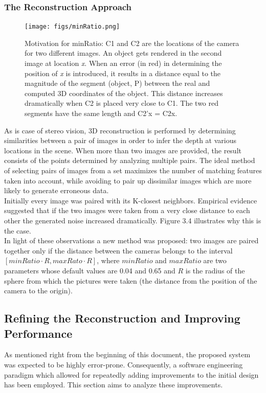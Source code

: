 \documentclass[12pt,a4paper,twoside,openright]{report}
\begin{document}
\subsubsection{The Reconstruction Approach}
\begin{figure}
\begin{center}
\texttt{[image: figs/minRatio.png]} 
\caption{Motivation for minRatio: C1 and C2 are the locations of the camera for two different images. An object gets rendered in the second image at location \emph{x}. When an error (in red) in determining the position of \emph{x} is introduced, it results in a distance equal to the magnitude of the segment (object, P) between the real and computed 3D coordinates of the object. This distance increases dramatically when C2 is placed very close to C1. The two red segments have the same length and C2'x = C2x.}
\end{center}
\end{figure}
As is case of stereo vision, 3D reconstruction is performed by determining similarities between a pair of images in order to infer the depth at various locations in the scene. When more than two images are provided, the result consists of the points determined by analyzing multiple pairs. The ideal method of selecting pairs of images from a set maximizes the number of matching features taken into account, while avoiding to pair up dissimilar images which are more likely to generate erroneous data.\\
\linebreak
Initially every image was paired with its K-closest neighbors. Empirical evidence suggested that if the two images were taken from a very close distance to each other the generated noise increased dramatically. Figure 3.4 illustrates why this is the case. \\
In light of these observations a new method was proposed: two images are paired together only if the distance between the cameras belongs to the interval $[minRatio \cdot R, maxRato \cdot R]$, where $minRatio$ and $maxRatio$ are two parameters whose default values are 0.04 and 0.65 and $R$ is the radius of the sphere from which the pictures were taken (the distance from the position of the camera to the origin).

\subsection{Refining the Reconstruction and Improving Performance}
As mentioned right from the beginning of this document, the proposed system was expected to be highly error-prone. Consequently, a software engineering paradigm which allowed for repeatedly adding improvements to the initial design has been employed. This section aims to analyze these improvements.
\end{document}
